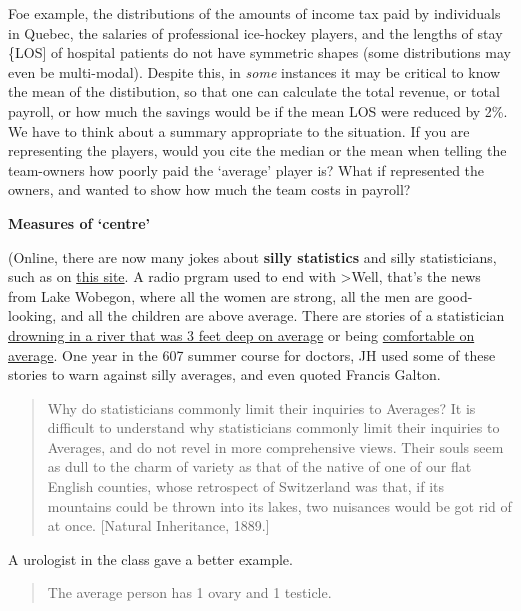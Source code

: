 \documentclass[]{book}
\begin{document}
Foe example, the distributions of the amounts of income tax paid by individuals in Quebec, the salaries of professional ice-hockey players, and the lengths of stay \{LOS{]} of hospital patients do not have symmetric shapes (some distributions may even be multi-modal). Despite this, in \emph{some} instances it may be critical to know the mean of the distibution, so that one can calculate the total revenue, or total payroll, or how much the savings would be if the mean LOS were reduced by 2\%.
We have to think about a summary appropriate to the situation. If you are representing the players, would you cite the median or the mean when telling the team-owners how poorly paid the `average' player is? What if represented the owners, and wanted to show how much the team costs in payroll?

\textbf{Measures of `centre'}

(Online, there are now many jokes about \textbf{silly statistics} and silly statisticians, such as on \href{http://www.workjoke.com/statisticians-jokes.html}{this site}.
A radio prgram used to end with
\textgreater{}Well, that's the news from Lake Wobegon, where all the women are strong, all the men are good-looking, and all the children are above average.
There are stories of a statistician \href{https://ask.metafilter.com/261337/Source-of-well-known-joke-about-statisticians}{drowning in a river that was 3 feet deep on
average}
or being \href{https://www.barrypopik.com/index.php/new_york_city/entry/head_in_the_oven_feet_in_the_freezer}{comfortable on average}. One year in the 607 summer course for doctors, JH used some of these stories to warn against silly averages, and even quoted Francis Galton.

\begin{quote}
Why do statisticians commonly limit their inquiries to Averages?
It is difficult to understand why statisticians commonly limit their inquiries to Averages, and do not revel in more comprehensive views.
Their souls seem as dull to the charm of variety as that of the native of one of our flat English counties, whose retrospect of Switzerland was that, if its mountains could be thrown into its lakes, two nuisances would be got rid of at once. {[}Natural Inheritance, 1889.{]}
\end{quote}

A urologist in the class gave a better example.

\begin{quote}
The average person has 1 ovary and 1 testicle.
\end{quote}
\end{document}
